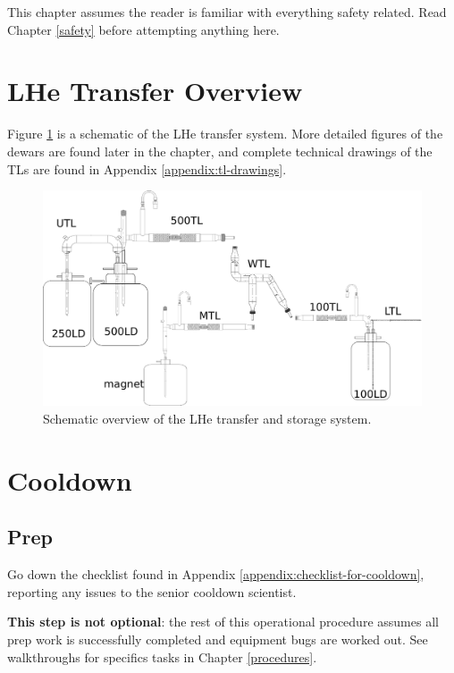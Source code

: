 This chapter assumes the reader is familiar with everything safety related.  Read Chapter \ref{safety} before attempting anything here.

\section{LHe Transfer Overview}

Figure \ref{fig:cryo-schematic-all} is a schematic of the LHe transfer system.  More detailed figures of the dewars are found later in the chapter, and complete technical drawings of the TLs are found in Appendix \ref{appendix:tl-drawings}.

\begin{figure}[htbp!]
 \centering
 \includegraphics[width=\textwidth]{./img/cryo-schematic-all.png}
 \caption{Schematic overview of the LHe transfer and storage system.}
 \label{fig:cryo-schematic-all}
\end{figure}



\section{Cooldown}
\subsection{Prep}
\label{practical-op:prep}
Go down the checklist found in Appendix \ref{appendix:checklist-for-cooldown}, reporting any issues to the senior cooldown scientist.

\textbf{This step is not optional}: the rest of this operational procedure assumes all prep work is successfully completed and equipment bugs are worked out.  See walkthroughs for specifics tasks in Chapter \ref{procedures}.

